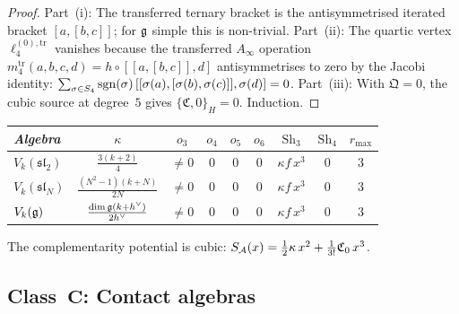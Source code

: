 \begin{proof}
Part~(i): The transferred ternary bracket is the
antisymmetrised iterated bracket $[a,[b,c]]$; for $\mathfrak{g}$
simple this is non-trivial. Part~(ii): The quartic vertex
$\ell_4^{(0),\mathrm{tr}}$ vanishes because the transferred
$A_\infty$ operation $m_4^{\mathrm{tr}}(a,b,c,d) =
h \circ [[a,[b,c]],d]$ antisymmetrises to zero by the Jacobi
identity: $\sum_{\sigma \in S_4} \operatorname{sgn}(\sigma)\,
[[\sigma(a),[\sigma(b),\sigma(c)]],\sigma(d)] = 0$.
Part~(iii): With $\mathfrak{Q} = 0$, the cubic source at
degree~$5$ gives $\{\mathfrak{C}, 0\}_H = 0$. Induction.
\end{proof}

\begin{example}
\label{ex:thqg-lie-data}
\begin{center}
\small
\renewcommand{\arraystretch}{1.15}
\begin{tabular}{lcccccccc}
\toprule
\emph{Algebra} & $\kappa$ & $o_3$ & $o_4$ & $o_5$ &
 $o_6$ & $\mathrm{Sh}_3$ & $\mathrm{Sh}_4$ & $r_{\max}$ \\
\midrule
$V_k(\mathfrak{sl}_2)$ &
 $\frac{3(k+2)}{4}$ & $\neq 0$ & $0$ & $0$ & $0$ &
 $\kappa f\,x^3$ & $0$ & $3$ \\
$V_k(\mathfrak{sl}_N)$ &
 $\frac{(N^2{-}1)(k+N)}{2N}$ & $\neq 0$ & $0$ & $0$ & $0$ &
 $\kappa f\,x^3$ & $0$ & $3$ \\
$V_k(\mathfrak{g})$ &
 $\frac{\dim\mathfrak{g}(k+h^\vee)}{2h^\vee}$ & $\neq 0$ & $0$ & $0$ & $0$ &
 $\kappa f\,x^3$ & $0$ & $3$ \\
\bottomrule
\end{tabular}
\end{center}
The complementarity potential is cubic:
$S_{\mathcal{A}}(x) = \frac{1}{2}\kappa\,x^2 + \frac{1}{3!}
\mathfrak{C}_0\,x^3$.
\end{example}



\subsection{Class~$\mathbf{C}$: Contact algebras}
\label{subsec:thqg-contact}

